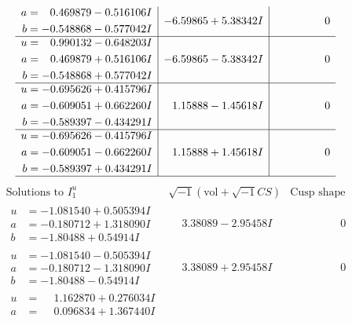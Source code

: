 \documentclass[1p]{elsarticle_modified}
\theoremstyle{definition}
\newcommand{\I}{\sqrt{-1}}
\begin{document}
$$\begin{array}{c|c|c}
\begin{aligned}
a &= \phantom{-}0.469879 - 0.516106 I \\
b &= -0.548868 - 0.577042 I\end{aligned}
 & -6.59865 + 5.38342 I & \phantom{-0.000000 } 0 \\ \hline\begin{aligned}
u &= \phantom{-}0.990132 - 0.648203 I \\
a &= \phantom{-}0.469879 + 0.516106 I \\
b &= -0.548868 + 0.577042 I\end{aligned}
 & -6.59865 - 5.38342 I & \phantom{-0.000000 } 0 \\ \hline\begin{aligned}
u &= -0.695626 + 0.415796 I \\
a &= -0.609051 + 0.662260 I \\
b &= -0.589397 - 0.434291 I\end{aligned}
 & \phantom{-}1.15888 - 1.45618 I & \phantom{-0.000000 } 0 \\ \hline\begin{aligned}
u &= -0.695626 - 0.415796 I \\
a &= -0.609051 - 0.662260 I \\
b &= -0.589397 + 0.434291 I\end{aligned}
 & \phantom{-}1.15888 + 1.45618 I & \phantom{-0.000000 } 0\\
 \hline 
 \end{array}$$\newpage$$\begin{array}{c|c|c}  
\text{Solutions to }I^u_{1}& \I (\text{vol} + \sqrt{-1}CS) & \text{Cusp shape}\\
 \hline 
\begin{aligned}
u &= -1.081540 + 0.505394 I \\
a &= -0.180712 + 1.318090 I \\
b &= -1.80488 + 0.54914 I\end{aligned}
 & \phantom{-}3.38089 - 2.95458 I & \phantom{-0.000000 } 0 \\ \hline\begin{aligned}
u &= -1.081540 - 0.505394 I \\
a &= -0.180712 - 1.318090 I \\
b &= -1.80488 - 0.54914 I\end{aligned}
 & \phantom{-}3.38089 + 2.95458 I & \phantom{-0.000000 } 0 \\ \hline\begin{aligned}
u &= \phantom{-}1.162870 + 0.276034 I \\
a &= \phantom{-}0.096834 + 1.367440 I \\

\end{aligned}
\end{array}$$
\end{document}
